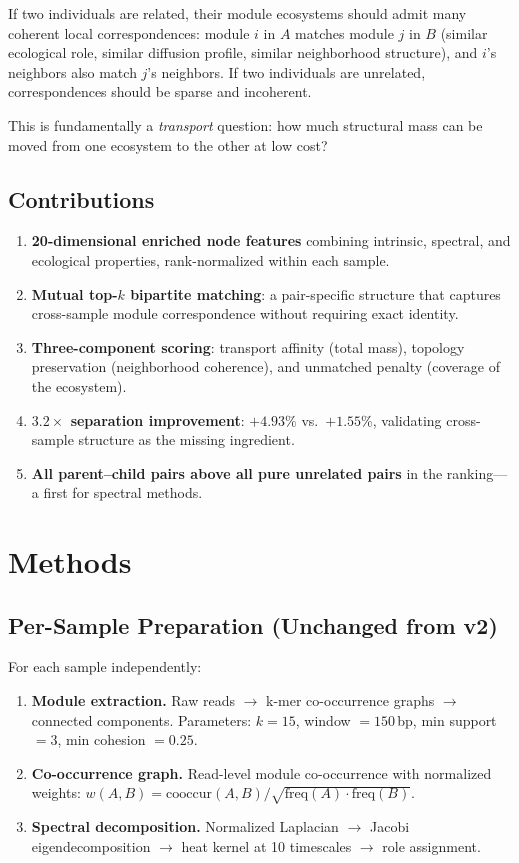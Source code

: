 \documentclass{../yalumba}
\begin{document}
If two individuals are related, their module ecosystems should admit many
coherent local correspondences: module $i$ in $A$ matches module $j$ in $B$
(similar ecological role, similar diffusion profile, similar neighborhood
structure), and $i$'s neighbors also match $j$'s neighbors.  If two
individuals are unrelated, correspondences should be sparse and incoherent.

This is fundamentally a \emph{transport} question: how much structural mass
can be moved from one ecosystem to the other at low cost?

\subsection{Contributions}

\begin{enumerate}
  \item \textbf{20-dimensional enriched node features} combining intrinsic,
    spectral, and ecological properties, rank-normalized within each sample.
  \item \textbf{Mutual top-$k$ bipartite matching}: a pair-specific structure
    that captures cross-sample module correspondence without requiring exact
    identity.
  \item \textbf{Three-component scoring}: transport affinity (total mass),
    topology preservation (neighborhood coherence), and unmatched penalty
    (coverage of the ecosystem).
  \item \textbf{$3.2\times$ separation improvement}: $+4.93\%$ vs.\
    $+1.55\%$, validating cross-sample structure as the missing ingredient.
  \item \textbf{All parent--child pairs above all pure unrelated pairs}
    in the ranking---a first for spectral methods.
\end{enumerate}


\section{Methods}
\label{sec:methods}

\subsection{Per-Sample Preparation (Unchanged from v2)}

For each sample independently:

\begin{enumerate}
  \item \textbf{Module extraction.}  Raw reads $\to$ k-mer co-occurrence
    graphs $\to$ connected components.  Parameters: $k=15$, window $=150$\,bp,
    min support $=3$, min cohesion $=0.25$.
  \item \textbf{Co-occurrence graph.}  Read-level module co-occurrence with
    normalized weights:
    $w(A,B) = \text{cooccur}(A,B) / \sqrt{\text{freq}(A) \cdot \text{freq}(B)}$.
  \item \textbf{Spectral decomposition.}  Normalized Laplacian $\to$ Jacobi
    eigendecomposition $\to$ heat kernel at 10 timescales $\to$ role assignment.
\end{enumerate}
\end{document}
